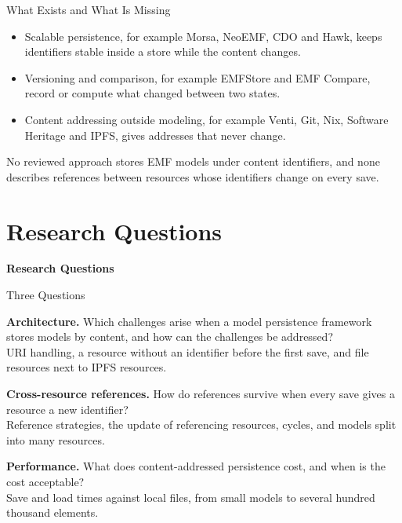 \documentclass[aspectratio=169, table, 12pt]{beamer}
\begin{document}
\begin{frame}{{\Large What Exists and What Is Missing}}
  \vspace{8pt}
  \begin{itemize}
    \item Scalable persistence, for example Morsa, NeoEMF, CDO and Hawk, keeps
          identifiers stable inside a store while the content changes.
    \item Versioning and comparison, for example EMFStore and EMF Compare,
          record or compute what changed between two states.
    \item Content addressing outside modeling, for example Venti, Git, Nix,
          Software Heritage and IPFS, gives addresses that never change.
  \end{itemize}
  \vspace{10pt}
  \begin{tcolorbox}[colback=praditagreen!8, colframe=praditagreen, boxrule=0.6pt, arc=2pt]
    \small No reviewed approach stores EMF models under content identifiers,
    and none describes references between resources whose identifiers change
    on every save.
  \end{tcolorbox}
\end{frame}

\section{Research Questions}

\begin{frame}{\hfill}
  \centering
  \Huge{\textbf{Research Questions}}
\end{frame}

\begin{frame}{{\Large Three Questions}}
  \vspace{16pt}
  \small
  \begin{description}[RQ3]
    \item[RQ1] \textbf{Architecture.} Which challenges arise when a model
          persistence framework stores models by content, and how can the
          challenges be addressed?\\
          {\footnotesize URI handling, a resource without an identifier before
          the first save, and file resources next to IPFS resources.}
    \item[RQ2] \textbf{Cross-resource references.} How do references survive
          when every save gives a resource a new identifier?\\
          {\footnotesize Reference strategies, the update of referencing
          resources, cycles, and models split into many resources.}
    \item[RQ3] \textbf{Performance.} What does content-addressed persistence
          cost, and when is the cost acceptable?\\
          {\footnotesize Save and load times against local files, from small
          models to several hundred thousand elements.}
  \end{description}
\end{frame}
\end{document}
